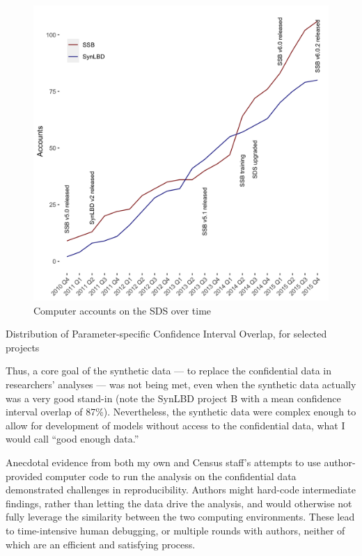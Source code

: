 \documentclass{article}
\begin{document}
\begin{figure}
    \centering
    \includegraphics[width=\textwidth]{figs/accounts-2015.png}
    \caption{Computer accounts on the SDS over time}
    \label{fig:growth_in_sds}
\end{figure}

\begin{table}[]
    \centering
    
    
    \caption{Distribution of Parameter-specific Confidence Interval Overlap, for selected projects}
    \label{tab:overlap}
\end{table}

Thus, a core goal of the synthetic data --- to replace the confidential data in researchers' analyses --- was not being met, even when the synthetic data actually was a very good stand-in (note the SynLBD project B with a mean confidence interval overlap of 87\%). Nevertheless, the synthetic data were complex enough to allow for development of models without access to the confidential data, what I would call ``good enough data.''

Anecdotal evidence from both my own and Census staff's attempts to use author-provided computer code to run the analysis on the confidential data demonstrated challenges in reproducibility. Authors might hard-code intermediate findings, rather than letting the data drive the analysis, and would otherwise not fully leverage the similarity between the two computing environments. These lead to time-intensive human debugging, or multiple rounds with authors, neither of which are an efficient and satisfying process. 
\end{document}
